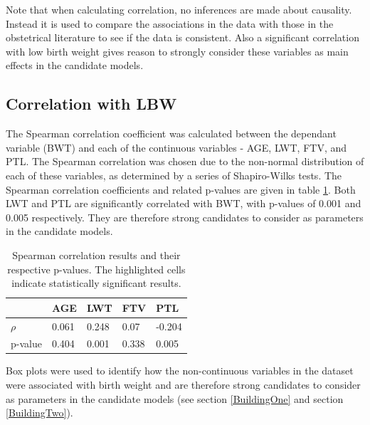Note that when calculating correlation, no inferences are made about causality. Instead it is used to compare the associations in the data with those in the obstetrical literature to see if the data is consistent. Also a significant correlation with low birth weight gives reason to strongly consider these variables as main effects in the candidate models.

\subsection{Correlation with LBW}
The Spearman correlation coefficient was calculated between the dependant variable (BWT) and each of the continuous variables - AGE, LWT, FTV, and PTL. The Spearman correlation was chosen due to the non-normal distribution of each of these variables, as determined by a series of Shapiro-Wilks tests. The Spearman correlation coefficients and related p-values are given in table \ref{tab:Spearman}. Both LWT and PTL are significantly correlated with BWT, with p-values of 0.001 and 0.005 respectively. They are therefore strong candidates to consider as parameters in the candidate models.

\vspace{0.3cm}
\renewcommand\arraystretch{1.2}
\begin{table}[ht]
\centering
\begin{tabular}[t]{lllll}
\toprule
& AGE & LWT & FTV & PTL \\
\midrule
$\rho$ & 0.061 & 0.248 & 0.07 & -0.204 \\
p-value & 0.404 & 0.001 & 0.338 & 0.005 \\
\bottomrule
\end{tabular}
\captionsetup{width=.69\linewidth}
\caption{Spearman correlation results and their respective p-values. The highlighted cells indicate statistically significant results.}
\label{tab:Spearman}
\end{table}%

Box plots were used to identify how the non-continuous variables in the dataset were associated with birth weight and are therefore strong candidates to consider as parameters in the candidate models (see section \ref{BuildingOne} and section \ref{BuildingTwo}).

